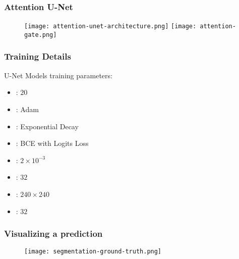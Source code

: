 \documentclass[../presentation.tex]{subfiles} %
\begin{document}
\begin{frame}[t]

	\frametitle{Attention U-Net}


	\begin{figure}
		\centering
		\texttt{[image: attention-unet-architecture.png]}
		\texttt{[image: attention-gate.png]}
	\end{figure}

\end{frame}


\begin{frame}[t]

	\frametitle{Training Details}

	U-Net Models training parameters:

	\begin{itemize}
		\setlength{\itemsep}{2ex}
		\item {}: $20$
		\item {}: Adam 
		\item {}: Exponential Decay 
		\item {}: BCE with Logits Loss %
		\item {}: $2 \times 10^{-3}$
		\item {}: $32$ 
		\item {}: $240 \times 240$
		\item {}: $32$
	\end{itemize}

\end{frame}


\begin{frame}

	\frametitle{Visualizing a prediction}

	\vspace{-2ex}

		\begin{figure}
			\centering
			\texttt{[image: segmentation-ground-truth.png]}
		\end{figure}

\end{frame}
\end{document}
